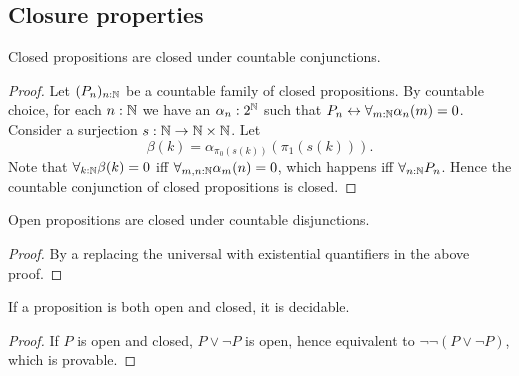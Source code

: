 \subsection{Closure properties}
\begin{lemma}\label{ClosedOpenCountableConDisjunction}
  Closed propositions are closed under countable conjunctions.
\end{lemma}
\begin{proof}
  Let $(P_n)_{n:\mathbb{N}}$ be a countable family of closed propositions. 
  By countable choice, for each 
  $n:\mathbb{N}$ we have an $\alpha_n:2^{\mathbb{N}} $ 
  such that $P_n \leftrightarrow \forall_{m:\mathbb{N}} \alpha_n(m)  =0$. 
  Consider a surjection $s:\mathbb{N} \to \mathbb{N} \times \mathbb{N}$.
  Let 
  $$\beta(k) = \alpha_{\pi_0(s(k))}(\pi_1 (s(k))).$$
  Note that $\forall_{k:\mathbb{N}} \beta(k) = 0$ iff 
  $\forall_{m,n:\mathbb{N}}\alpha_m(n) = 0$, which happens iff $\forall_{n:\mathbb{N}} P_n$. 
  Hence the countable conjunction of closed propositions is closed. 
\end{proof} 
\begin{lemma}
  Open propositions are closed under countable disjunctions. 
\end{lemma}
\begin{proof}
  By a replacing the universal with existential quantifiers in the above proof. 
\end{proof}
\begin{corollary}
  If a proposition is both open and closed, it is decidable. 
\end{corollary}
\begin{proof}
  If $P$ is open and closed, $P\vee \neg P$ is open, hence
  equivalent to $\neg \neg (P \vee \neg P)$, which is provable. 
\end{proof}

